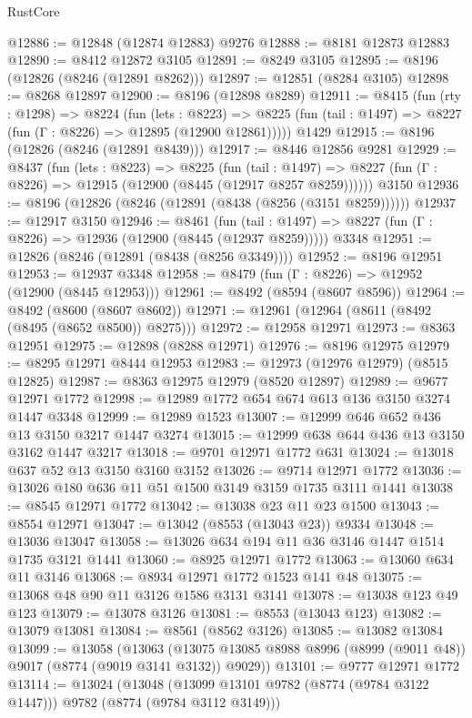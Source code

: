\begin{lexlean}{RustCore}
\begin{coremodule}
@12886 := @12848 (@12874 @12883) @9276
@12888 := @8181 @12873 @12883
@12890 := @8412 @12872 @3105
@12891 := @8249 @3105
@12895 := @8196 (@12826 (@8246 (@12891 @8262)))
@12897 := @12851 (@8284 @3105)
@12898 := @8268 @12897
@12900 := @8196 (@12898 @8289)
@12911 := @8415
    (fun (rty : @1298) =>
    @8224
      (fun (lets : @8223) =>
      @8225 (fun (tail : @1497) => @8227 (fun (Γ : @8226) => @12895 (@12900 @12861)))))
    @1429
@12915 := @8196 (@12826 (@8246 (@12891 @8439)))
@12917 := @8446 @12856 @9281
@12929 := @8437
    (fun (lets : @8223) =>
    @8225
      (fun (tail : @1497) =>
      @8227 (fun (Γ : @8226) => @12915 (@12900 (@8445 (@12917 @8257 @8259))))))
    @3150
@12936 := @8196 (@12826 (@8246 (@12891 (@8438 (@8256 (@3151 @8259))))))
@12937 := @12917 @3150
@12946 := @8461
    (fun (tail : @1497) => @8227 (fun (Γ : @8226) => @12936 (@12900 (@8445 (@12937 @8259)))))
    @3348
@12951 := @12826 (@8246 (@12891 (@8438 (@8256 @3349))))
@12952 := @8196 @12951
@12953 := @12937 @3348
@12958 := @8479 (fun (Γ : @8226) => @12952 (@12900 (@8445 @12953)))
@12961 := @8492 (@8594 (@8607 @8596))
@12964 := @8492 (@8600 (@8607 @8602))
@12971 := @12961 (@12964 (@8611 (@8492 (@8495 (@8652 @8500)) @8275)))
@12972 := @12958 @12971
@12973 := @8363 @12951
@12975 := @12898 (@8288 @12971)
@12976 := @8196 @12975
@12979 := @8295 @12971 @8444 @12953
@12983 := @12973 (@12976 @12979) (@8515 @12825)
@12987 := @8363 @12975 @12979 (@8520 @12897)
@12989 := @9677 @12971 @1772
@12998 := @12989 @1772 @654 @674 @613 @136 @3150 @3274 @1447 @3348
@12999 := @12989 @1523
@13007 := @12999 @646 @652 @436 @13 @3150 @3217 @1447 @3274
@13015 := @12999 @638 @644 @436 @13 @3150 @3162 @1447 @3217
@13018 := @9701 @12971 @1772 @631
@13024 := @13018 @637 @52 @13 @3150 @3160 @3152
@13026 := @9714 @12971 @1772
@13036 := @13026 @180 @636 @11 @51 @1500 @3149 @3159 @1735 @3111 @1441
@13038 := @8545 @12971 @1772
@13042 := @13038 @23 @11 @23 @1500
@13043 := @8554 @12971
@13047 := @13042 (@8553 (@13043 @23)) @9334
@13048 := @13036 @13047
@13058 := @13026 @634 @194 @11 @36 @3146 @1447 @1514 @1735 @3121 @1441
@13060 := @8925 @12971 @1772
@13063 := @13060 @634 @11 @3146
@13068 := @8934 @12971 @1772 @1523 @141 @48
@13075 := @13068 @48 @90 @11 @3126 @1586 @3131 @3141
@13078 := @13038 @123 @49 @123
@13079 := @13078 @3126
@13081 := @8553 (@13043 @123)
@13082 := @13079 @13081
@13084 := @8561 (@8562 @3126)
@13085 := @13082 @13084
@13099 := @13058
    (@13063 (@13075 @13085 @8988 @8996 (@8999 (@9011 @48)) @9017 (@8774 (@9019 @3141 @3132)) @9029))
@13101 := @9777 @12971 @1772
@13114 := @13024
    (@13048 (@13099 @13101 @9782 (@8774 (@9784 @3122 @1447))) @9782 (@8774 (@9784 @3112 @3149)))

\end{coremodule}
\end{lexlean}
